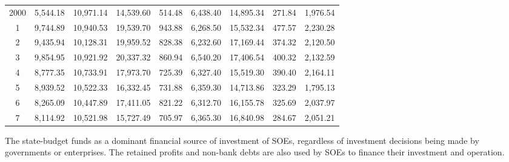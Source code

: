 \documentclass{ws-rv9x6}
\begin{document}
\begin{sidewaystable}
{\begin{tabular}{@{}ccccccccc@{}}
2000 &5,544.18 &10,971.14 &14,539.60 &514.48 &6,438.40 &14,895.34
&271.84 &1,976.54\\ 
1 &9,744.89 &10,940.53 &19,539.70 &943.88 &6,268.50 &15,532.34 &477.57
&2,230.28\\
2 &9,435.94 &10,128.31 &19,959.52 &828.38 &6,232.60 &17,169.44 &374.32
&2,120.50\\
3 &9,854.95 &10,921.92 &20,337.32 &860.94 &6,540.20 &17,406.54 &400.32
&2,132.59\\
4 &8,777.35 &10,733.91 &17,973.70 &725.39 &6,327.40 &15,519.30 &390.40
&2,164.11\\
5 &8,939.52 &10,522.33 &16,332.45 &731.88 &6,359.30 &14,713.86 &323.29
&1,795.13\\
6 &8,265.09 &10,447.89 &17,411.05 &821.22 &6,312.70 &16,155.78 &325.69
&2,037.97\\
7 &8,114.92 &10,521.98 &15,727.49 &705.97 &6,365.30 &16,840.98 &284.67
&2,051.21\\
\hline
\end{tabular}}
\begin{tabnote}
The state-budget funds as a dominant financial source of investment 
of SOEs, regardless of investment decisions being made by governments 
or enterprises. The retained profits and non-bank debts are also used by
SOEs to finance their investment and operation.
\end{tabnote}
\end{sidewaystable}
\end{document}
